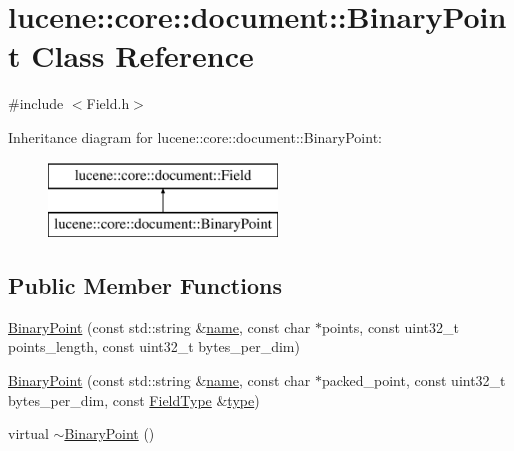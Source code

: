 \hypertarget{classlucene_1_1core_1_1document_1_1BinaryPoint}{}\section{lucene\+:\+:core\+:\+:document\+:\+:Binary\+Point Class Reference}
\label{classlucene_1_1core_1_1document_1_1BinaryPoint}


{\ttfamily \#include $<$Field.\+h$>$}

Inheritance diagram for lucene\+:\+:core\+:\+:document\+:\+:Binary\+Point\+:\begin{figure}[H]
\begin{center}
\leavevmode
\includegraphics[height=2.000000cm]{classlucene_1_1core_1_1document_1_1BinaryPoint}
\end{center}
\end{figure}
\subsection*{Public Member Functions}
\begin{DoxyCompactItemize}
\item 
\mbox{\hyperlink{classlucene_1_1core_1_1document_1_1BinaryPoint_acd524392b16aaeaa05120e87a79e487f}{Binary\+Point}} (const std\+::string \&\mbox{\hyperlink{classlucene_1_1core_1_1document_1_1Field_a52f673f3b3abb14b180f5159f4726537}{name}}, const char $\ast$points, const uint32\+\_\+t points\+\_\+length, const uint32\+\_\+t bytes\+\_\+per\+\_\+dim)
\item 
\mbox{\hyperlink{classlucene_1_1core_1_1document_1_1BinaryPoint_a8eea62d212ffd7385f3e6a6f0ca6c482}{Binary\+Point}} (const std\+::string \&\mbox{\hyperlink{classlucene_1_1core_1_1document_1_1Field_a52f673f3b3abb14b180f5159f4726537}{name}}, const char $\ast$packed\+\_\+point, const uint32\+\_\+t bytes\+\_\+per\+\_\+dim, const \mbox{\hyperlink{classlucene_1_1core_1_1document_1_1FieldType}{Field\+Type}} \&\mbox{\hyperlink{classlucene_1_1core_1_1document_1_1Field_a7d5849d933ebde73422710069643ccff}{type}})
\item 
virtual \mbox{\hyperlink{classlucene_1_1core_1_1document_1_1BinaryPoint_a5825353f88fb9f50e0e918dd87453b1b}{$\sim$\+Binary\+Point}} ()
\end{DoxyCompactItemize}
